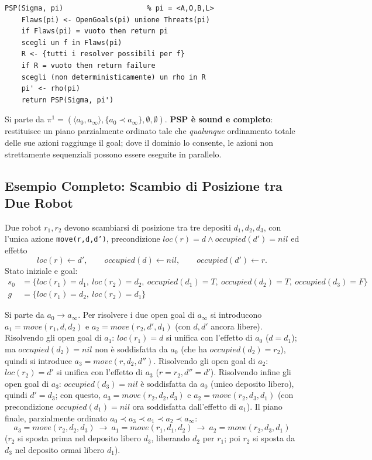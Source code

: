 \documentclass[a4paper,11pt]{article}
\begin{document}
\begin{lstlisting}
PSP(Sigma, pi)                    % pi = <A,O,B,L>
    Flaws(pi) <- OpenGoals(pi) unione Threats(pi)
    if Flaws(pi) = vuoto then return pi
    scegli un f in Flaws(pi)
    R <- {tutti i resolver possibili per f}
    if R = vuoto then return failure
    scegli (non deterministicamente) un rho in R
    pi' <- rho(pi)
    return PSP(Sigma, pi')
\end{lstlisting}
Si parte da $\pi^1=(\langle a_0,a_\infty\rangle,\{a_0\prec a_\infty\},\emptyset,\emptyset)$. \textbf{PSP è sound e completo}: restituisce un piano parzialmente ordinato tale che \emph{qualunque} ordinamento totale delle sue azioni raggiunge il goal; dove il dominio lo consente, le azioni non strettamente sequenziali possono essere eseguite in parallelo.

\subsection{Esempio Completo: Scambio di Posizione tra Due Robot}

Due robot $r_1,r_2$ devono scambiarsi di posizione tra tre depositi $d_1,d_2,d_3$, con l'unica azione \texttt{move(r,d,d')}, precondizione $loc(r){=}d\wedge occupied(d'){=}nil$ ed effetto
\[
loc(r)\leftarrow d',\qquad occupied(d)\leftarrow nil,\qquad occupied(d')\leftarrow r.
\]
Stato iniziale e goal:
\begin{align*}
s_0 &= \{loc(r_1){=}d_1,\ loc(r_2){=}d_2,\ occupied(d_1){=}T,\ occupied(d_2){=}T,\ occupied(d_3){=}F\}\\
g &= \{loc(r_1){=}d_2,\ loc(r_2){=}d_1\}
\end{align*}

Si parte da $a_0\to a_\infty$. Per risolvere i due open goal di $a_\infty$ si introducono $a_1{=}move(r_1,d,d_2)$ e $a_2{=}move(r_2,d',d_1)$ (con $d,d'$ ancora libere). Risolvendo gli open goal di $a_1$: $loc(r_1){=}d$ si unifica con l'effetto di $a_0$ ($d{=}d_1$); ma $occupied(d_2){=}nil$ non è soddisfatta da $a_0$ (che ha $occupied(d_2){=}r_2$), quindi si introduce $a_3{=}move(r,d_2,d'')$. Risolvendo gli open goal di $a_2$: $loc(r_2){=}d'$ si unifica con l'effetto di $a_3$ ($r{=}r_2,d''{=}d'$). Risolvendo infine gli open goal di $a_3$: $occupied(d_3){=}nil$ è soddisfatta da $a_0$ (unico deposito libero), quindi $d'{=}d_3$; con questo, $a_3{=}move(r_2,d_2,d_3)$ e $a_2{=}move(r_2,d_3,d_1)$ (con precondizione $occupied(d_1){=}nil$ ora soddisfatta dall'effetto di $a_1$). Il piano finale, parzialmente ordinato $a_0\prec a_3\prec a_1\prec a_2\prec a_\infty$:
\[
a_3{=}move(r_2,d_2,d_3)\ \to\ a_1{=}move(r_1,d_1,d_2)\ \to\ a_2{=}move(r_2,d_3,d_1)
\]
($r_2$ si sposta prima nel deposito libero $d_3$, liberando $d_2$ per $r_1$; poi $r_2$ si sposta da $d_3$ nel deposito ormai libero $d_1$).
\end{document}
